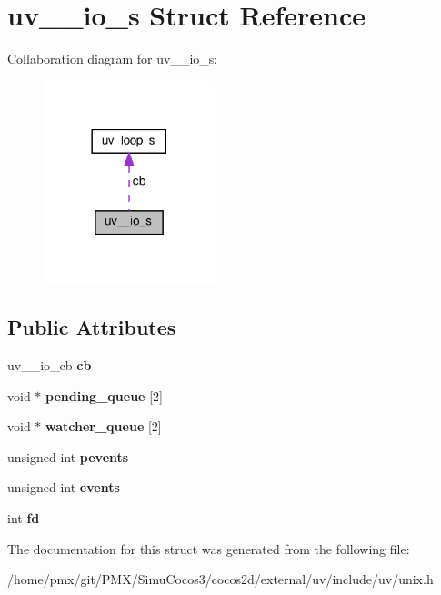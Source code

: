 \hypertarget{structuv____io__s}{}\section{uv\+\_\+\+\_\+io\+\_\+s Struct Reference}
\label{structuv____io__s}


Collaboration diagram for uv\+\_\+\+\_\+io\+\_\+s\+:
\nopagebreak
\begin{figure}[H]
\begin{center}
\leavevmode
\includegraphics[width=141pt]{structuv____io__s__coll__graph}
\end{center}
\end{figure}
\subsection*{Public Attributes}
\begin{DoxyCompactItemize}
\item 
\mbox{\label{structuv____io__s_a155c800db22abfac6c65e717ea5e17cc}} 
uv\+\_\+\+\_\+io\+\_\+cb {\bfseries cb}
\item 
\mbox{\label{structuv____io__s_a9fd9e9bc633f4a68988d4d11934d834e}} 
void $\ast$ {\bfseries pending\+\_\+queue} \mbox{[}2\mbox{]}
\item 
\mbox{\label{structuv____io__s_a28f768761c5a496256263f7677f4be9c}} 
void $\ast$ {\bfseries watcher\+\_\+queue} \mbox{[}2\mbox{]}
\item 
\mbox{\label{structuv____io__s_a9a8ba3ae3e18355c3341e2e50657c73a}} 
unsigned int {\bfseries pevents}
\item 
\mbox{\label{structuv____io__s_a575481d9c01f83f1fd15e3f0a2a8befc}} 
unsigned int {\bfseries events}
\item 
\mbox{\label{structuv____io__s_ad54f5c79beefb3c45d5053968c05950e}} 
int {\bfseries fd}
\end{DoxyCompactItemize}


The documentation for this struct was generated from the following file\+:\begin{DoxyCompactItemize}
\item 
/home/pmx/git/\+P\+M\+X/\+Simu\+Cocos3/cocos2d/external/uv/include/uv/unix.\+h\end{DoxyCompactItemize}
